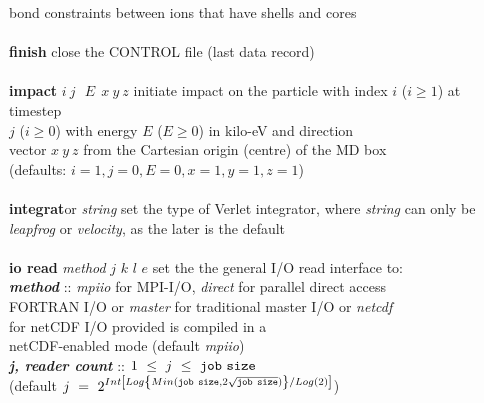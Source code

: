 \begin{tabbing}
\>                                              \> bond constraints between ions that have shells and cores \\
\>                                              \> \\
\> {\bf finish}                                 \> close the CONTROL file (last data record) \\
\>                                              \> \\
\> {\bf impact} $i~j~~~E~~x~y~z$                \> initiate impact on the particle with index $i$ ($i \ge 1$) at timestep \\
\>                                              \> $j$ ($i \ge 0$) with energy $E$ ($E \ge 0$) in kilo-eV and direction \\
\>                                              \> vector $x~y~z$ from the Cartesian origin (centre) of the MD box \\
\>                                              \> (defaults: $i = 1, j = 0, E = 0, x = 1, y = 1, z = 1$) \\
\>                                              \> \\
\> {\bf integrat}or {\em string}                \> set the type of Verlet integrator, where {\em string} can only be \\
\>                                              \> {\em leapfrog} or {\em velocity}, as the later is the default \\
\>                                              \> \\
\> {\bf io read} {\em method}  $j$ $k$ $l$ $e$  \> set the the general I/O read interface to: \\
\>                                              \> {\bf \em method} :: {\em mpiio} for MPI-I/O, {\em direct} for parallel direct access \\
\>                                              \> \phantom{x} FORTRAN I/O or {\em master} for traditional master I/O or {\em netcdf} \\
\>                                              \> \phantom{x} for netCDF I/O provided \D is compiled in a \\
\>                                              \> \phantom{x} netCDF-enabled mode (default {\em mpiio}) \\
\>                                              \> \phantom{xxx} {\bf \em j, reader count} :: $1~\le~j~\le~{\tt job~size}$ \\
\>                                              \> \phantom{xxxx} (default $j~=~2^{Int\left[Log\left\{Min({\tt job~size},2\sqrt{\tt job~size})\right\}/Log(2)\right]}$) \\

\end{tabbing}
